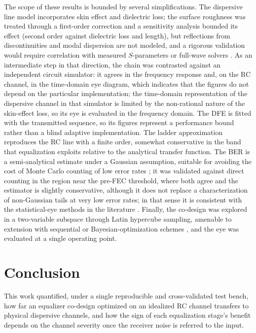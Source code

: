 \documentclass{ieeeaccess}
\begin{document}
The scope of these results is bounded by several simplifications. The
dispersive line model incorporates skin effect and dielectric loss; the
surface roughness was treated through a first-order correction and a
sensitivity analysis bounded its effect (second order against dielectric loss
and length), but reflections from discontinuities and modal dispersion are
not modeled, and a rigorous validation would require correlation with
measured $S$-parameters or full-wave solvers \cite{9134991,5089870}. As an
intermediate step in that direction, the chain was contrasted against an
independent circuit simulator: it agrees in the frequency response and, on
the RC channel, in the time-domain eye diagram, which indicates that the
figures do not depend on the particular implementation; the time-domain
representation of the dispersive channel in that simulator is limited by the
non-rational nature of the skin-effect loss, so its eye is evaluated in the
frequency domain. The DFE is fitted with the transmitted sequence, so its
figures represent a performance bound rather than a blind adaptive
implementation. The ladder approximation reproduces the RC line with a finite
order, somewhat conservative in the band that equalization exploits relative
to the analytical transfer function. The BER is a semi-analytical estimate
under a Gaussian assumption, suitable for avoiding the cost of Monte Carlo
counting of low error rates \cite{6248821}; it was validated against direct
counting in the region near the pre-FEC threshold, where both agree and the
estimator is slightly conservative, although it does not replace a
characterization of non-Gaussian tails at very low error rates; in that sense
it is consistent with the statistical-eye methods in the literature
\cite{7202856,10415105}. Finally, the co-design was explored in a
two-variable subspace through Latin hypercube sampling, amenable to extension
with sequential or Bayesian-optimization schemes \cite{11309336}, and the eye
was evaluated at a single operating point.

\section{Conclusion}
\label{sec:conclusion}

This work quantified, under a single reproducible and cross-validated test
bench, how far an equalizer co-design optimized on an idealized RC channel
transfers to physical dispersive channels, and how the sign of each
equalization stage's benefit depends on the channel severity once the
receiver noise is referred to the input.
\end{document}
